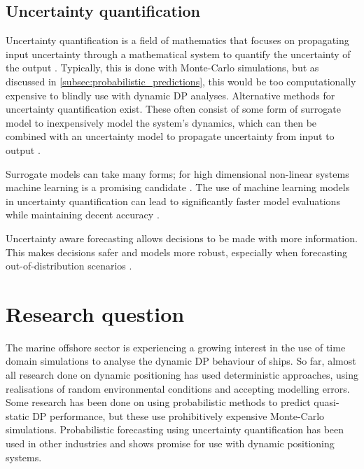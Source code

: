 \subsection{Uncertainty quantification}
\label{subsec:uncertainty_quantification}
Uncertainty quantification is a field of mathematics that focuses on propagating input uncertainty through a
mathematical system to quantify the uncertainty of the output
\parencite{ebadollahiTimedependentUncertaintyQuantification2025}. Typically, this is done with Monte-Carlo simulations,
but as discussed in \cref{subsec:probabilistic_predictions}, this would be too computationally expensive to blindly use with
dynamic DP analyses. Alternative methods for uncertainty quantification exist. These often consist of some form of
surrogate model to inexpensively model the system's dynamics, which can then be combined with an uncertainty model to
propagate uncertainty from input to output
\parencites{maiSurrogateModellingStochastic2016}{heuvelineHybridGeneralizedPolynomial2014}{nowotarskiRecentAdvancesElectricity2018}. 

Surrogate models can take many forms; for high dimensional non-linear systems machine learning is a promising candidate
\parencite{salinasDeepARProbabilisticForecasting2020}. The use of machine learning models in uncertainty quantification
can lead to significantly faster model evaluations while maintaining decent accuracy
\parencite{willardIntegratingPhysicsBasedModelling2022}.

Uncertainty aware forecasting allows decisions to be made with more information. This makes decisions safer and models
more robust, especially when forecasting out-of-distribution scenarios \parencite{oleksiienkoVariationalNeuralNetworks2023}.

\section{Research question}
\label{sec:research_question}
The marine offshore sector is experiencing a growing interest in the use of time domain simulations to analyse the
dynamic DP behaviour of ships. So far, almost all research done on dynamic positioning has used deterministic
approaches, using realisations of random environmental conditions and accepting modelling errors. Some research has been
done on using probabilistic methods to predict quasi-static DP performance, but these use prohibitively expensive
Monte-Carlo simulations. Probabilistic forecasting using uncertainty quantification has been used in other industries
and shows promise for use with dynamic positioning systems. 


